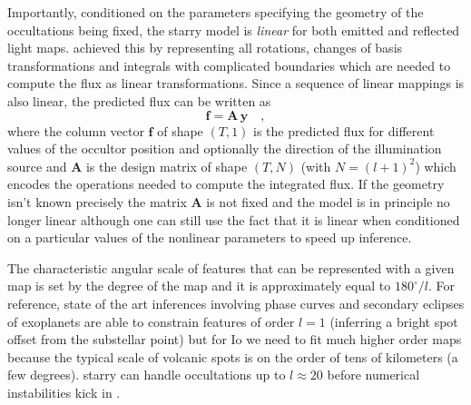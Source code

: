 \documentclass[modern]{aastex62}
\begin{document}
Importantly, conditioned on the parameters specifying the geometry of the occultations being fixed, the \textsf{starry} model is \emph{linear} for both emitted and reflected light maps.
\cite{luger2019} achieved this by representing all rotations, changes of basis transformations and integrals with complicated boundaries which are needed to compute the flux as linear transformations.
Since a sequence of linear mappings is also linear, the predicted flux can be written as
\begin{equation}
    \mathbf{f}=\mathbf{A}\,\mathbf{y}
    \quad,
    \label{eq:linear_model}
\end{equation}
where the column vector $\mathbf{f}$ of shape $(T, 1)$ is the predicted flux for different values of the occultor position and optionally the direction of the illumination source and $\mathbf{A}$ is the design matrix \citep[see appendix B.1. in ][]{luger2021a} of shape $(T, N)$ (with $N=(l+1)^2$) which encodes the operations needed to compute the integrated flux.
If the geometry isn't known precisely the matrix $\mathbf{A}$ is not fixed and the model is in principle no longer linear although one can still use the fact that it is linear when conditioned on a particular values of the nonlinear parameters to speed up inference.

The characteristic angular scale of features that can be represented with a given map is set by the degree of the map and it is approximately equal to $180^\circ/l$.
For reference, state of the art inferences involving phase curves and secondary eclipses of exoplanets are able to constrain features of order $l=1$ (inferring a bright spot offset from the substellar point) but for Io we need to fit much higher order maps because the typical scale of volcanic spots is on the order of tens of kilometers (a few degrees).
\textsf{starry} can handle occultations up to $l\approx 20$ before numerical instabilities kick in \citep{luger2019a}.
\end{document}
